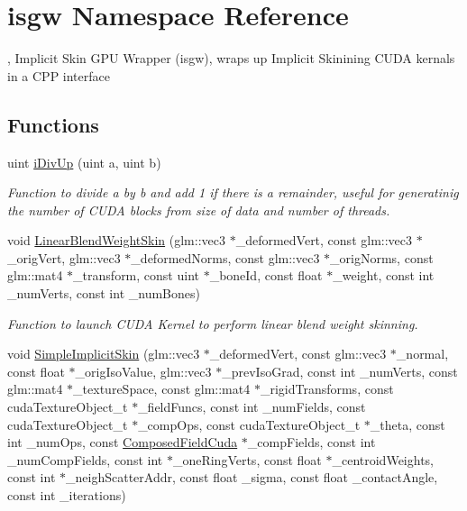 \hypertarget{namespaceisgw}{}\section{isgw Namespace Reference}
\label{namespaceisgw}


, Implicit Skin G\+PU Wrapper (isgw), wraps up Implicit Skinining C\+U\+DA kernals in a C\+PP interface  


\subsection*{Functions}
\begin{DoxyCompactItemize}
\item 
uint \hyperlink{namespaceisgw_a2e4ac5beae0fbbe25749f7ba5a85805e}{i\+Div\+Up} (uint a, uint b)
\begin{DoxyCompactList}\small\item\em Function to divide a by b and add 1 if there is a remainder, useful for generatinig the number of C\+U\+DA blocks from size of data and number of threads. \end{DoxyCompactList}\item 
void \hyperlink{namespaceisgw_a9f9396298bae07477376b8fa48795327}{Linear\+Blend\+Weight\+Skin} (glm\+::vec3 $\ast$\+\_\+deformed\+Vert, const glm\+::vec3 $\ast$\+\_\+orig\+Vert, glm\+::vec3 $\ast$\+\_\+deformed\+Norms, const glm\+::vec3 $\ast$\+\_\+orig\+Norms, const glm\+::mat4 $\ast$\+\_\+transform, const uint $\ast$\+\_\+bone\+Id, const float $\ast$\+\_\+weight, const int \+\_\+num\+Verts, const int \+\_\+num\+Bones)
\begin{DoxyCompactList}\small\item\em Function to launch C\+U\+DA Kernel to perform linear blend weight skinning. \end{DoxyCompactList}\item 
void \hyperlink{namespaceisgw_acd11ec618e357fefdc8e530211339cdf}{Simple\+Implicit\+Skin} (glm\+::vec3 $\ast$\+\_\+deformed\+Vert, const glm\+::vec3 $\ast$\+\_\+normal, const float $\ast$\+\_\+orig\+Iso\+Value, glm\+::vec3 $\ast$\+\_\+prev\+Iso\+Grad, const int \+\_\+num\+Verts, const glm\+::mat4 $\ast$\+\_\+texture\+Space, const glm\+::mat4 $\ast$\+\_\+rigid\+Transforms, const cuda\+Texture\+Object\+\_\+t $\ast$\+\_\+field\+Funcs, const int \+\_\+num\+Fields, const cuda\+Texture\+Object\+\_\+t $\ast$\+\_\+comp\+Ops, const cuda\+Texture\+Object\+\_\+t $\ast$\+\_\+theta, const int \+\_\+num\+Ops, const \hyperlink{classComposedFieldCuda}{Composed\+Field\+Cuda} $\ast$\+\_\+comp\+Fields, const int \+\_\+num\+Comp\+Fields, const int $\ast$\+\_\+one\+Ring\+Verts, const float $\ast$\+\_\+centroid\+Weights, const int $\ast$\+\_\+neigh\+Scatter\+Addr, const float \+\_\+sigma, const float \+\_\+contact\+Angle, const int \+\_\+iterations)

\end{DoxyCompactItemize}
